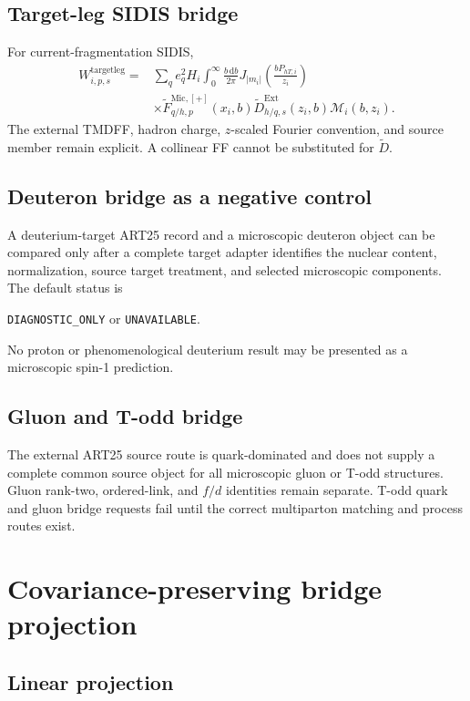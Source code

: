 \documentclass[11pt]{article}
\newcommand{\dd}{\mathrm{d}}
\newcommand{\cM}{\mathcal M}
\newcommand{\Ext}{\ensuremath{\mathrm{Ext}}}
\newcommand{\Mic}{\ensuremath{\mathrm{Mic}}}
\begin{document}
\subsection{Target-leg SIDIS bridge}

For current-fragmentation SIDIS,
\begin{align}
 W_{i,p,s}^{\mathrm{targetleg}}
 ={}&
 \sum_q e_q^2 H_i
 \int_0^\infty\frac{b\,\dd b}{2\pi}
 J_{|m_i|}\!\left(\frac{bP_{hT,i}}{z_i}\right)
 \nonumber\\
 &\times
 \widetilde F_{q/h,p}^{\Mic,[+]}(x_i,b)
 \widetilde D_{h/q,s}^{\Ext}(z_i,b)
 \cM_i(b,z_i).
 \label{eq:sidis-target-leg}
\end{align}
The external TMDFF, hadron charge, \(z\)-scaled Fourier convention, and source member remain explicit.  A collinear FF cannot be substituted for \(\widetilde D\).

\subsection{Deuteron bridge as a negative control}

A deuterium-target ART25 record and a microscopic deuteron object can be compared only after a complete target adapter identifies the nuclear content, normalization, source target treatment, and selected microscopic components.  The default status is
\begin{center}
\texttt{DIAGNOSTIC\_ONLY} or \texttt{UNAVAILABLE}.
\end{center}
No proton or phenomenological deuterium result may be presented as a microscopic spin-1 prediction.

\subsection{Gluon and T-odd bridge}

The external ART25 source route is quark-dominated and does not supply a complete common source object for all microscopic gluon or T-odd structures.  Gluon rank-two, ordered-link, and \(f/d\) identities remain separate.  T-odd quark and gluon bridge requests fail until the correct multiparton matching and process routes exist.

\section{Covariance-preserving bridge projection}
\label{sec:covariance-projection}

\subsection{Linear projection}
\end{document}
